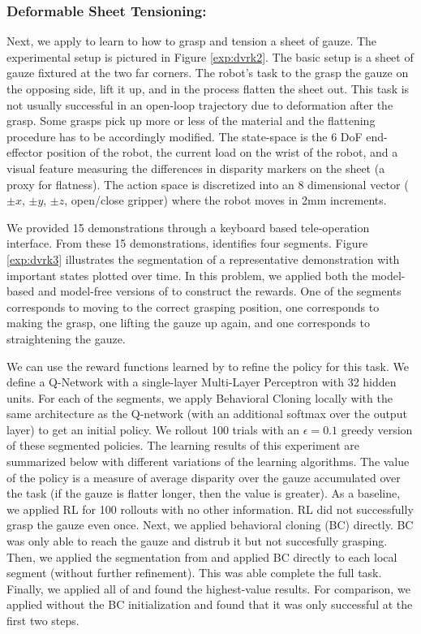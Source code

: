 \subsubsection{Deformable Sheet Tensioning: } Next, we apply \hirl to learn to how to grasp and tension a sheet of gauze. The experimental setup is pictured in Figure \ref{exp:dvrk2}. The basic setup is a sheet of gauze fixtured at the two far corners. The robot's task to the grasp the gauze on the opposing side, lift it up, and in the process flatten the sheet out.
This task is not usually successful in an open-loop trajectory due to deformation after the grasp.
Some grasps pick up more or less of the material and the flattening procedure has to be accordingly modified.
The state-space is the 6 DoF end-effector position of the robot, the current load on the wrist of the robot, and a visual feature measuring the differences in disparity markers on the sheet (a proxy for flatness).
The action space is discretized into an 8 dimensional vector ($\pm x$, $\pm y$, $\pm z$, open/close gripper) where the robot moves in 2mm increments.

We provided 15 demonstrations through a keyboard based tele-operation interface.
From these 15 demonstrations, \hirl identifies four segments. Figure \ref{exp:dvrk3} illustrates the segmentation of a representative demonstration with important states plotted over time.
In this problem, we applied both the model-based and model-free versions of \hirl to construct the rewards.
One of the segments corresponds to moving to the correct grasping position, one corresponds to making the grasp, one lifting the gauze up again, and one corresponds to straightening the gauze.

We can use the reward functions learned by \hirl to refine the policy for this task.
We define a Q-Network with a single-layer Multi-Layer Perceptron with 32 hidden units.
For each of the segments, we apply Behavioral Cloning locally with the same architecture as the Q-network (with an additional softmax over the output layer) to get an initial policy. We rollout 100 trials with an $\epsilon=0.1$ greedy version of these segmented policies.
The learning results of this experiment are summarized below with different variations of the learning algorithms.
The value of the policy is a measure of average disparity over the gauze accumulated over the task (if the gauze is flatter longer, then the value is greater).
As a baseline, we applied RL for 100 rollouts with no other information. RL did not successfully grasp the gauze even once.
Next, we applied behavioral cloning (BC) directly.
BC was only able to reach the gauze and distrub it but not succesfully grasping.
Then, we applied the segmentation from \hirl  and applied BC directly to each local segment (without further refinement). 
This was able complete the full task.
Finally, we applied all of \hirl and found the highest-value results.
For comparison, we applied \hirl without the BC initialization and found that it was only successful at the first two steps.

